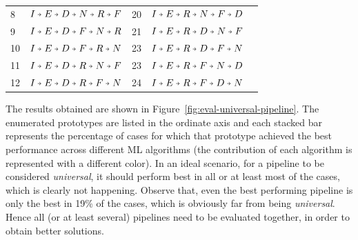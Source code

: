 \begin{table}[t]
\begin{center}
\begin{tabular}{@{}lllll@{}}
8  & {\color[HTML]{000000} $I\veryshortarrow E \veryshortarrow D\veryshortarrow N \veryshortarrow R \veryshortarrow F$} & 20 & {\color[HTML]{000000} $I\veryshortarrow E \veryshortarrow R \veryshortarrow N \veryshortarrow F \veryshortarrow D$} \\
9  & {\color[HTML]{000000} $I\veryshortarrow E \veryshortarrow D\veryshortarrow F\veryshortarrow N \veryshortarrow R$} & 21 & {\color[HTML]{000000} $I\veryshortarrow E \veryshortarrow R \veryshortarrow D\veryshortarrow N \veryshortarrow F$} \\
10 & {\color[HTML]{000000} $I\veryshortarrow E \veryshortarrow D\veryshortarrow F \veryshortarrow R\veryshortarrow N$} & 23 & {\color[HTML]{000000} $I\veryshortarrow E \veryshortarrow R \veryshortarrow D \veryshortarrow F \veryshortarrow N$} \\
11 & {\color[HTML]{000000} $I\veryshortarrow E \veryshortarrow D\veryshortarrow R \veryshortarrow N \veryshortarrow F$} & 23 & {\color[HTML]{000000} $I\veryshortarrow E \veryshortarrow R \veryshortarrow F \veryshortarrow N \veryshortarrow D$} \\
12 & {\color[HTML]{000000} $I\veryshortarrow E \veryshortarrow D\veryshortarrow R \veryshortarrow F\veryshortarrow N$} & 24 & {\color[HTML]{000000} $I\veryshortarrow E \veryshortarrow R \veryshortarrow F \veryshortarrow D\veryshortarrow N$}
\\ \bottomrule
\end{tabular}
\end{center}
\end{table}

The results obtained are shown in Figure~\ref{fig:eval-universal-pipeline}.
The enumerated prototypes are listed in the ordinate axis and each stacked bar represents the percentage of cases for which that prototype achieved the best performance across different ML algorithms (the contribution of each algorithm is represented with a different color). In an ideal scenario, for a pipeline to be considered \textit{universal}, it should perform best in all or at least most of the cases, which is clearly not happening. Observe that, even the best performing pipeline is only the best in 19\% of the cases, which is obviously far from being \textit{universal}. Hence all (or at least several) pipelines need to be evaluated together, in order to obtain better solutions. 


